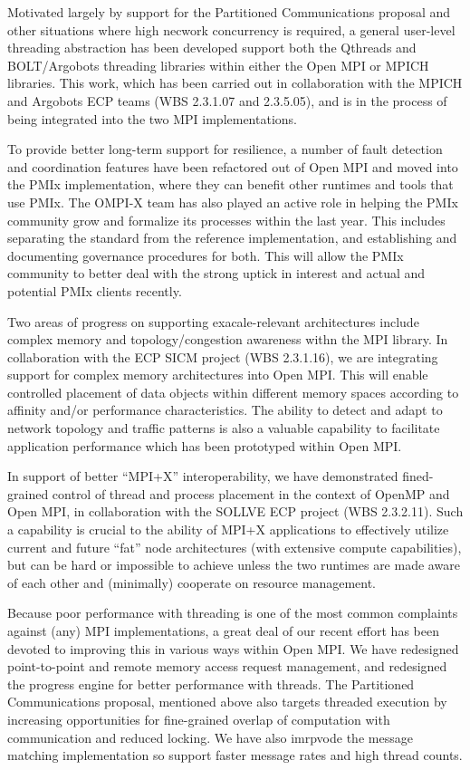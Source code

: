 Motivated largely by support for the Partitioned Communications proposal and other situations where high necwork concurrency is required, a general user-level threading abstraction has been developed support both the Qthreads and BOLT/Argobots threading libraries within either the Open MPI or MPICH libraries.  This work, which has been carried out in collaboration with the MPICH and Argobots ECP teams (WBS 2.3.1.07 and 2.3.5.05), and is in the process of being integrated into the two MPI implementations.

To provide better long-term support for resilience, a number of fault detection and coordination features have been refactored out of Open MPI and moved into the PMIx implementation, where they can benefit other runtimes and tools that use PMIx.  The OMPI-X team has also played an active role in helping the PMIx community grow and formalize its processes within the last year.  This includes separating the standard from the reference implementation, and establishing and documenting governance procedures for both.  This will allow the PMIx community to better deal with the strong uptick in interest and actual and potential PMIx clients recently.

Two areas of progress on supporting exacale-relevant architectures include complex memory and topology/congestion awareness withn the MPI library. In collaboration with the ECP SICM project (WBS 2.3.1.16), we are integrating support for complex memory architectures into Open MPI.  This will enable controlled placement of data objects within different memory spaces according to affinity and/or performance characteristics.  The ability to detect and adapt to network topology and traffic patterns is also a valuable capability to facilitate application performance which has been prototyped within Open MPI.

In support of better ``MPI+X'' interoperability, we have demonstrated fined-grained control of thread and process placement in the context of OpenMP and Open MPI, in collaboration with the SOLLVE ECP project (WBS 2.3.2.11). Such a capability is crucial to the ability of MPI+X applications to effectively utilize current and future ``fat'' node architectures (with extensive compute capabilities), but can be hard or impossible to achieve unless the two runtimes are made aware of each other and (minimally) cooperate on resource management.

Because poor performance with threading is one of the most common complaints against (any) MPI implementations, a great deal of our recent effort has been devoted to improving this in various ways within Open MPI.  We have redesigned point-to-point and remote memory access request management, and redesigned the progress engine for better performance with threads.  The Partitioned Communications proposal, mentioned above also targets threaded execution by increasing opportunities for fine-grained overlap of computation with communication and reduced locking.  We have also imrpvode the message matching implementation so support faster message rates and high thread counts.

